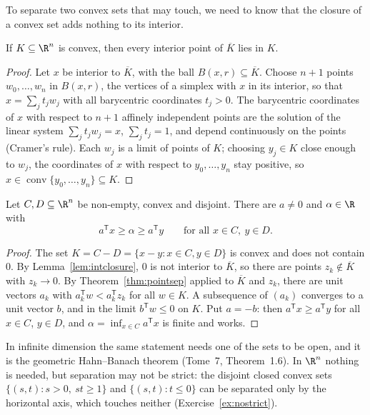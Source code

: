 To separate two convex sets that may touch, we need to know that the closure of a convex set adds nothing to its interior.

\begin{lemma}\label{lem:intclosure}
If $K\subseteq\R^n$ is convex, then every interior point of $\overline K$ lies in $K$.
\end{lemma}
\begin{proof}
Let $x$ be interior to $\overline K$, with the ball $B(x,r)\subseteq\overline K$. Choose $n+1$ points $w_0,\dots,w_n$ in $B(x,r)$, the vertices of a simplex with $x$ in its interior,
so that $x=\sum_jt_jw_j$ with all barycentric coordinates $t_j>0$. The barycentric coordinates of $x$ with respect to $n+1$ affinely independent points are the solution of
the linear system $\sum_jt_jw_j=x$, $\sum_jt_j=1$, and depend continuously on the points (Cramer's rule). Each $w_j$ is a limit of points of $K$; choosing
$y_j\in K$ close enough to $w_j$, the coordinates of $x$ with respect to $y_0,\dots,y_n$ stay positive, so $x\in\operatorname{conv}\{y_0,\dots,y_n\}\subseteq K$.
\end{proof}

\begin{theorem}\label{thm:separation}
Let $C,D\subseteq\R^n$ be non-empty, convex and disjoint. There are $a\ne0$ and $\alpha\in\R$ with
\[
a^{\mathsf T}x\ge\alpha\ge a^{\mathsf T}y\qquad\text{for all }x\in C,\ y\in D.
\]
\end{theorem}
\begin{proof}
The set $K=C-D=\{x-y:x\in C,y\in D\}$ is convex and does not contain $0$. By Lemma~\ref{lem:intclosure}, $0$ is not interior to $\overline K$, so there are points $z_k\notin\overline K$ with
$z_k\to0$. By Theorem~\ref{thm:pointsep} applied to $\overline K$ and $z_k$, there are unit vectors $a_k$ with $a_k^{\mathsf T}w<a_k^{\mathsf T}z_k$ for all $w\in K$. A subsequence of
$(a_k)$ converges to a unit vector $b$, and in the limit $b^{\mathsf T}w\le0$ on $K$. Put $a=-b$: then $a^{\mathsf T}x\ge a^{\mathsf T}y$ for all $x\in C$, $y\in D$, and
$\alpha=\inf_{x\in C}a^{\mathsf T}x$ is finite and works.
\end{proof}

In infinite dimension the same statement needs one of the sets to be open, and it is the geometric Hahn--Banach theorem (Tome~7, Theorem~1.6). In
$\R^n$ nothing is needed, but separation may not be strict: the disjoint closed convex sets $\{(s,t):s>0,\ st\ge1\}$ and $\{(s,t):t\le0\}$ can be
separated only by the horizontal axis, which touches neither (Exercise~\ref{ex:nostrict}).

